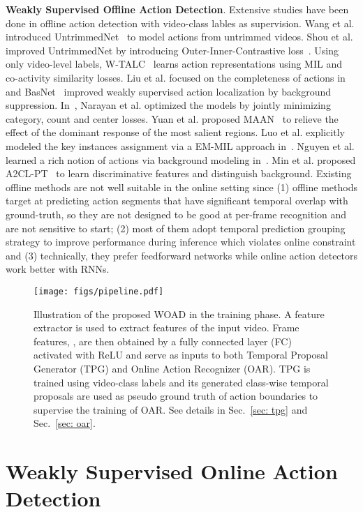 \documentclass[final]{cvpr}
\begin{document}
\textbf{Weakly Supervised Offline Action Detection}.
Extensive studies have been done in offline action detection with video-class lables as supervision. Wang et al. introduced UntrimmedNet~\cite{wang2017untrimmednets} to model actions from untrimmed videos. Shou et al. improved UntrimmedNet by introducing Outer-Inner-Contrastive loss~\cite{shou2018autoloc}. Using only video-level labels, W-TALC~\cite{paul2018w} learns action representations using MIL and co-activity similarity losses. Liu et al. focused on the completeness of actions in~\cite{Liu_2019_CVPR} and BasNet~\cite{lee2020background} improved weakly supervised action localization by background suppression. In~\cite{narayan20193cnet}, Narayan et al. optimized the models by jointly minimizing category, count and center losses. Yuan et al. proposed MAAN~\cite{yuan2018marginalized} to relieve the effect of the dominant response of the most salient regions. Luo et al. explicitly modeled the key instances assignment via a EM-MIL approach in~\cite{luo2020weakly}. Nguyen et al. learned a rich notion of actions via background modeling in~\cite{nguyen2019weakly}. Min et al. proposed A2CL-PT~\cite{min2020adversarial} to learn discriminative features and distinguish background. Existing offline methods are not well suitable in the online setting since (1) offline methods target at predicting action segments that have significant temporal overlap with ground-truth, so they are not designed to be good at per-frame recognition and are not sensitive to start; (2) most of them adopt temporal prediction grouping
strategy to improve performance during inference which violates online constraint and (3) technically, they prefer feedforward networks while online
action detectors work better with RNNs.
\begin{figure*}[htbp]
    \centering
    \texttt{[image: figs/pipeline.pdf]}
    \caption{Illustration of the proposed WOAD in the training phase. A feature extractor is used to extract features of the input video. Frame features, , are then obtained by a fully connected layer (FC) activated with ReLU and serve as inputs to both Temporal Proposal Generator (TPG) and Online Action Recognizer (OAR). TPG is trained using video-class labels and its generated class-wise temporal proposals are used as pseudo ground truth of action boundaries to supervise the training of OAR. See details in Sec.~\ref{sec: tpg} and Sec.~\ref{sec: oar}.
    }
    \label{fig: pipeline}
\end{figure*}
\section{Weakly Supervised Online Action Detection}
\end{document}
